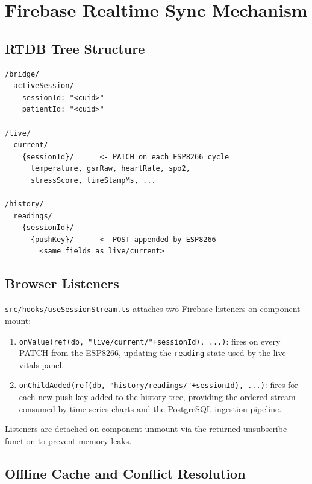 \documentclass[12pt,a4paper]{report}
\begin{document}
\section{Firebase Realtime Sync Mechanism}
\label{sec:firebase}

\subsection{RTDB Tree Structure}

\begin{lstlisting}[caption={Firebase RTDB path schema}]
/bridge/
  activeSession/
    sessionId: "<cuid>"
    patientId: "<cuid>"

/live/
  current/
    {sessionId}/      <- PATCH on each ESP8266 cycle
      temperature, gsrRaw, heartRate, spo2,
      stressScore, timeStampMs, ...

/history/
  readings/
    {sessionId}/
      {pushKey}/      <- POST appended by ESP8266
        <same fields as live/current>
\end{lstlisting}

\subsection{Browser Listeners}

\texttt{src/hooks/useSessionStream.ts} attaches two Firebase listeners
on component mount:

\begin{enumerate}[leftmargin=1.5em, itemsep=0.2em]
  \item \texttt{onValue(ref(db, "live/current/"+sessionId), ...)}: fires
        on every PATCH from the ESP8266, updating the \texttt{reading}
        state used by the live vitals panel.

  \item \texttt{onChildAdded(ref(db, "history/readings/"+sessionId), ...)}:
        fires for each new push key added to the history tree, providing
        the ordered stream consumed by time-series charts and the
        PostgreSQL ingestion pipeline.
\end{enumerate}

Listeners are detached on component unmount via the returned unsubscribe
function to prevent memory leaks.

\subsection{Offline Cache and Conflict Resolution}
\end{document}
